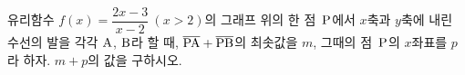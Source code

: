 유리함수 $f(x)=\dfrac{2x-3}{x-2}\ (x>2)$의 그래프 위의 한 점~$\mathrm{P}$에서 $x$축과 $y$축에 내린 수선의 발을 각각 $\mathrm{A}$, $\mathrm{B}$라 할 때, $\overline{\mathrm{PA}}+\overline{\mathrm{PB}}$의 최솟값을 $m$, 그때의 점~$\mathrm{P}$의 $x$좌표를 $p$라 하자. $m+p$의 값을 구하시오.
